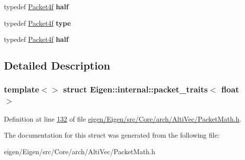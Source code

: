 \begin{DoxyCompactItemize}
typedef \hyperlink{struct_eigen_1_1internal_1_1_packet4f}{Packet4f} {\bfseries half}
\item 
\mbox{\label{struct_eigen_1_1internal_1_1packet__traits_3_01float_01_4_a753e39039ed22b2dde1684c1f8c62985}} 
typedef \hyperlink{struct_eigen_1_1internal_1_1_packet4f}{Packet4f} {\bfseries type}
\item 
\mbox{\label{struct_eigen_1_1internal_1_1packet__traits_3_01float_01_4_ae218bb63db50937a710084a1ed9747c0}} 
typedef \hyperlink{struct_eigen_1_1internal_1_1_packet4f}{Packet4f} {\bfseries half}
\end{DoxyCompactItemize}


\subsection{Detailed Description}
\subsubsection*{template$<$$>$\newline
struct Eigen\+::internal\+::packet\+\_\+traits$<$ float $>$}



Definition at line \hyperlink{eigen_2_eigen_2src_2_core_2arch_2_alti_vec_2_packet_math_8h_source_l00132}{132} of file \hyperlink{eigen_2_eigen_2src_2_core_2arch_2_alti_vec_2_packet_math_8h_source}{eigen/\+Eigen/src/\+Core/arch/\+Alti\+Vec/\+Packet\+Math.\+h}.



The documentation for this struct was generated from the following file\+:\begin{DoxyCompactItemize}
\item 
eigen/\+Eigen/src/\+Core/arch/\+Alti\+Vec/\+Packet\+Math.\+h\end{DoxyCompactItemize}
